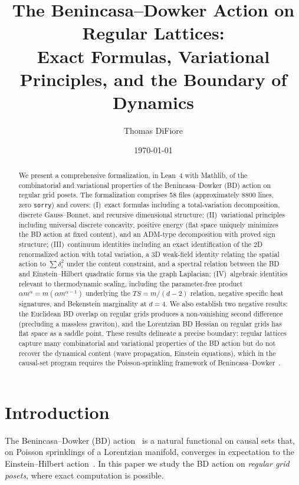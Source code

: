 \documentclass[11pt,a4paper]{article}
\title{The Benincasa--Dowker Action on Regular Lattices:\\
Exact Formulas, Variational Principles, and the Boundary of Dynamics}
\author{Thomas DiFiore}
\date{\today}
\theoremstyle{remark}
\begin{document}
\maketitle

\begin{abstract}
We present a comprehensive formalization, in Lean~4 with Mathlib, of the
combinatorial and variational properties of the Benincasa--Dowker (BD) action
on regular grid posets. The formalization comprises 58 files (approximately
8800 lines, zero \texttt{sorry}) and covers:
(I)~exact formulas including a total-variation decomposition,
discrete Gauss--Bonnet, and recursive dimensional structure;
(II)~variational principles including universal discrete concavity,
positive energy (flat space uniquely minimizes the BD action at fixed content),
and an ADM-type decomposition with proved sign structure;
(III)~continuum identities including an exact identification of the
2D renormalized action with total variation, a 3D weak-field identity relating
the spatial action to $\sum\delta_i^2$ under the content constraint, and
a spectral relation between the BD and Einstein--Hilbert quadratic forms
via the graph Laplacian;
(IV)~algebraic identities relevant to thermodynamic scaling, including the
parameter-free product $\alpha m^\alpha = m(\alpha m^{\alpha-1})$ underlying
the $TS = m/(d{-}2)$ relation, negative specific heat signatures, and
Bekenstein marginality at $d = 4$.
We also establish two negative results: the Euclidean BD overlap on regular grids
produces a non-vanishing second difference (precluding a massless graviton),
and the Lorentzian BD Hessian on regular grids has flat space as a saddle point.
These results delineate a precise boundary: regular lattices capture many
combinatorial and variational properties of the BD action but do not recover
the dynamical content (wave propagation, Einstein equations), which in the
causal-set program requires the Poisson-sprinkling framework of
Benincasa--Dowker~\cite{BD2010}.
\end{abstract}

\tableofcontents

\section{Introduction}

The Benincasa--Dowker (BD) action~\cite{BD2010} is a natural functional on
causal sets that, on Poisson sprinklings of a Lorentzian manifold, converges
in expectation to the Einstein--Hilbert action~\cite{BD2010,Dowker2013}.
In this paper we study the BD action on \emph{regular grid posets}, where
exact computation is possible.
\end{document}
